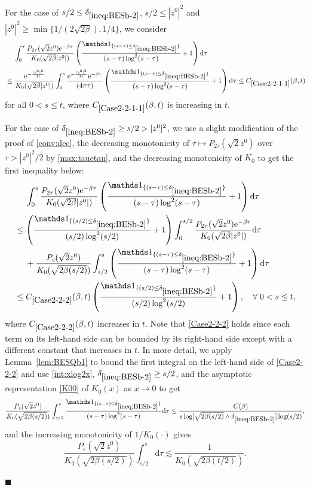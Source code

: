 \documentclass[12pt, twoside]{article}
\numberwithin{figure}{section}
\newcommand{\less}{\lesssim}
\newcommand{\e}{{\mathrm e}}
\newcommand{\1}{\mathds 1}
\renewcommand{\d}{{\mathrm d}}
\newcommand{\2}{{\mathbf 1}}
\renewenvironment{proof}[1][\proofname]{\noindent {\bfseries #1.}\;}{\hfill\ensuremath{\blacksquare}\\}
\newcommand{\cc}{{^\circ}}
\newcommand{\two}{{\sqrt{2}}}
\newcommand{\deltaz}{\delta_{\ref{ineq:BESb-2}}}
\begin{document}
\begin{proof}[Proof of Proposition~\ref{prop:BESmom} (1$\cc$)]
For the case of $s/2\leq \deltaz$, $s/2\leq |z^0|^2$ and $|z^0|^2\geq \min\{1/(2\sqrt{2\beta}),1/4\}$, we consider
\begin{align}
&\quad\;\int_0^s \frac{P_{2\tau}(\two z^0)\e^{-\beta \tau}}{{K_0(\sqrt{2\beta}|z^0|)}}\left(\frac{\1_{\{(s-\tau)\leq \deltaz\}}}{(s-\tau)\log^2(s-\tau)}+1\right)\d \tau\notag\\
&\leq \frac{\e^{-\frac{|z^0|^2}{4t}}}{K_0(\sqrt{2\beta}|z^0|)}\int_0^s \frac{\e^{-\frac{|z^0|^2}{4\tau}}\e^{-\beta \tau}}{(4\pi \tau){}}\left(\frac{\1_{\{(s-\tau)\leq \deltaz\}}}{(s-\tau)\log^2(s-\tau)}+1\right)\d \tau\leq C_{\ref{Case2-2-1-1}}(\beta,t)\label{Case2-2-1-1}
\end{align}
for all $0< s\leq t$, where $C_{\ref{Case2-2-1-1}}(\beta,t)$ is increasing in $t$. 


For the case of $\deltaz\geq s/2>|z^0|^2$, we use a slight modification of the proof of \eqref{conv:dec}, the decreasing monotonicity of $\tau\mapsto P_{2\tau}(\two z^0)$ over $\tau>|z^0|^2/2$ by \eqref{max:tauetau}, and the decreasing monotonicity of $K_0$ to get the first inequality below:
\begin{align}
&\quad\; \int_0^s \frac{P_{2\tau}(\two z^0)\e^{-\beta \tau}}{{K_0(\sqrt{2\beta}|z^0|)}}
\left(\frac{\1_{\{(s-\tau)\leq \deltaz\}}}{(s-\tau)\log^2(s-\tau)}+1\right)\d \tau\notag\\
&\leq \left(\frac{\1_{\{(s/2)\leq \deltaz\}}}{(s/2)\log^2(s/2)}+1\right)
\int_0^{s/2} \frac{P_{2\tau}(\two z^0)\e^{-\beta \tau}}{{K_0(\sqrt{2\beta}|z^0|)}}\d \tau\notag\\
&\quad\;+\frac{P_{s}(\two z^0)}{{K_0(\sqrt{2\beta(s/2)})}}
\int_{s/2}^s\left(\frac{\1_{\{(s-\tau)\leq \deltaz\}}}{(s-\tau)\log^2(s-\tau)}+1\right)\d \tau\notag\\
&\leq C_{\ref{Case2-2-2}}(\beta,t)  \left(\frac{\1_{\{(s/2)\leq \deltaz\}}}{(s/2)\log^2(s/2)}+1\right),\quad \forall\;0<s\leq t,\label{Case2-2-2}
\end{align}
where $C_{\ref{Case2-2-2}}(\beta,t)$ increases in $t$. 
Note that \eqref{Case2-2-2} holds since each term on its left-hand side can be bounded by its right-hand side
except with a different constant that increases in $t$. In more detail, 
we apply Lemma~\ref{lem:BESQb1} to bound the first integral on the left-hand side of \eqref{Case2-2-2} and use  
\eqref{int:xlog2x}, $\deltaz\geq s/2$, and the asymptotic representation \eqref{K00} of $K_0(x)$ as $x\to 0$ to get
\[
\frac{P_{s}(\two z^0)}{{K_0(\sqrt{2\beta(s/2)})}}
\int_{s/2}^s\frac{\1_{\{(s-\tau)\leq \deltaz\}}}{(s-\tau)\log^2(s-\tau)}\d \tau\leq
\frac{C(\beta)}{s\log[ \sqrt{2\beta(s/2)} \wedge \deltaz]\log(s/2)},
\]
and the increasing monotonicity of $1/K_0(\cdot)$ gives
\[
\frac{P_{s}(\two z^0)}{{K_0(\sqrt{2\beta(s/2)})}}
\int_{s/2}^s\d \tau\less \frac{1}{{K_0(\sqrt{2\beta(t/2)})}}.
\]


\end{proof}
\end{document}
